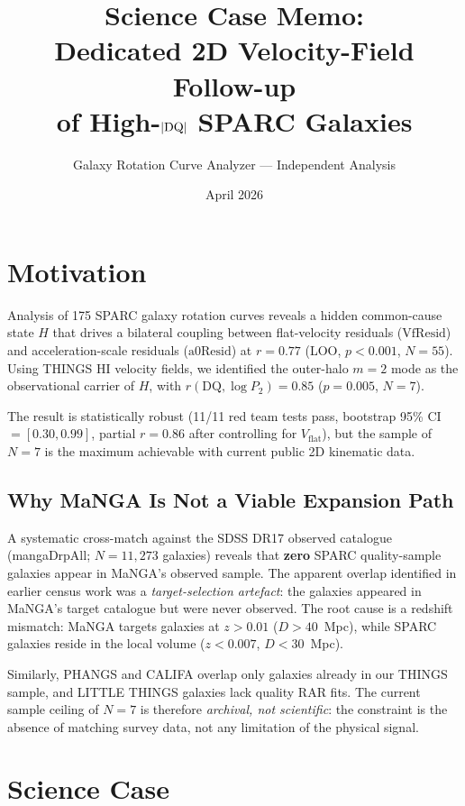 \documentclass[11pt]{article}
\title{Science Case Memo:\\Dedicated 2D Velocity-Field Follow-up\\of High-$|\DQ|$ SPARC Galaxies}
\author{Galaxy Rotation Curve Analyzer --- Independent Analysis}
\date{April 2026}
\newcommand{\vflat}{V_\mathrm{flat}}
\newcommand{\DQ}{\mathrm{DQ}}
\newcommand{\mtwo}{m{=}2}
\begin{document}
\maketitle

\section{Motivation}

Analysis of 175 SPARC galaxy rotation curves reveals a hidden common-cause state $H$ that drives a bilateral coupling between flat-velocity residuals ($\mathrm{VfResid}$) and acceleration-scale residuals ($\mathrm{a0Resid}$) at $r = 0.77$ (LOO, $p < 0.001$, $N = 55$).
Using THINGS HI velocity fields, we identified the outer-halo $\mtwo$ mode as the observational carrier of $H$, with $r(\DQ, \log P_2) = 0.85$ ($p = 0.005$, $N = 7$).

The result is statistically robust (11/11 red team tests pass, bootstrap 95\% CI $= [0.30, 0.99]$, partial $r = 0.86$ after controlling for $\vflat$), but the sample of $N = 7$ is the maximum achievable with current public 2D kinematic data.

\subsection{Why MaNGA Is Not a Viable Expansion Path}

A systematic cross-match against the SDSS DR17 observed catalogue (mangaDrpAll; $N = 11{,}273$ galaxies) reveals that \textbf{zero} SPARC quality-sample galaxies appear in MaNGA's observed sample.
The apparent overlap identified in earlier census work was a \emph{target-selection artefact}: the galaxies appeared in MaNGA's target catalogue but were never observed.
The root cause is a redshift mismatch: MaNGA targets galaxies at $z > 0.01$ ($D > 40$~Mpc), while SPARC galaxies reside in the local volume ($z < 0.007$, $D < 30$~Mpc).

Similarly, PHANGS and CALIFA overlap only galaxies already in our THINGS sample, and LITTLE THINGS galaxies lack quality RAR fits.
The current sample ceiling of $N = 7$ is therefore \emph{archival, not scientific}: the constraint is the absence of matching survey data, not any limitation of the physical signal.

\section{Science Case}
\end{document}
